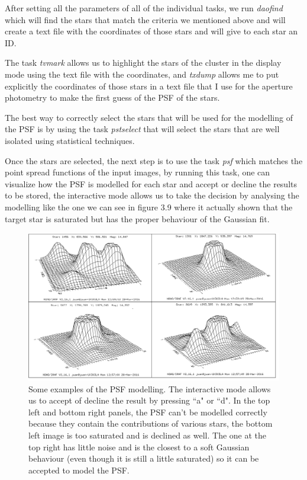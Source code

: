 After setting all the parameters of all of the individual tasks, we run \textit{daofind} which will find the stars that match the criteria we mentioned above and will create a text file with the coordinates of those stars and will give to each star an ID.

The task \textit{tvmark} allows us to highlight the stars of the cluster in the display mode using the text file with the coordinates, and \textit{txdump} allows me to  put explicitly the coordinates of those stars in a text file that I use for the aperture photometry to make the first guess of the PSF of the stars.

The best way to correctly select the stars that will be used for the modelling of the PSF is by using the task \textit{pstselect} that will select the stars that are well isolated using statistical techniques. 

Once the stars are selected, the next step is to use the task \textit{psf} which matches the point spread functions of the input images, by running this task, one can visualize how the PSF is modelled for each star and accept or decline the results to be stored, the interactive mode allows us to take the decision by analysing the modelling like the one we can see in figure 3.9 where it actually shown that the target star is saturated but has the proper behaviour of the Gaussian fit.

\begin{figure}[H]
\centering
\includegraphics[width=12cm]{images/psf.png}
\caption[PSF modelling]{Some examples of the PSF modelling. The interactive mode allows us to accept of decline the result by pressing ``a" or ``d". In the top left and bottom right panels, the PSF can't be modelled correctly because they contain the contributions of various stars, the bottom left image is too saturated and is declined as well. The one at the top right has little noise and is the closest to a soft Gaussian behaviour (even though it is still a little saturated) so it can be accepted to model the PSF.}
\end{figure}

